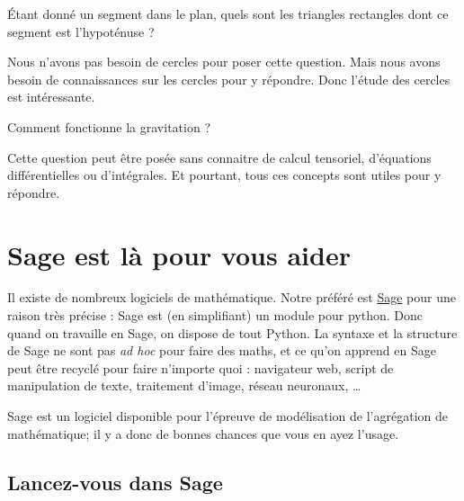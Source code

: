 \begin{example}
    Étant donné un segment dans le plan, quels sont les triangles rectangles dont ce segment est l'hypoténuse ?

    Nous n'avons pas besoin de cercles pour poser cette question. Mais nous avons besoin de connaissances sur les cercles pour y répondre. Donc l'étude des cercles est intéressante.
\end{example}

\begin{example}
    Comment fonctionne la gravitation ?

    Cette question peut être posée sans connaitre de calcul tensoriel, d'équations différentielles ou d'intégrales. Et pourtant, tous ces concepts sont utiles pour y répondre.
\end{example}

\section{Sage est là pour vous aider}

Il existe de nombreux logiciels de mathématique. Notre préféré est \href{http://www.sagemath.org}{Sage} pour une raison très précise : Sage est (en simplifiant) un module pour python. Donc quand on travaille en Sage, on dispose de tout Python. La syntaxe et la structure de Sage ne sont pas \emph{ad hoc} pour faire des maths, et ce qu'on apprend en Sage peut être recyclé pour faire n'importe quoi : navigateur web, script de manipulation de texte, traitement d'image, réseau neuronaux, \ldots


Sage est un logiciel disponible pour l'épreuve de modélisation de l'agrégation de mathématique; il y a donc de bonnes chances que vous en ayez l'usage.

\subsection{Lancez-vous dans Sage}


